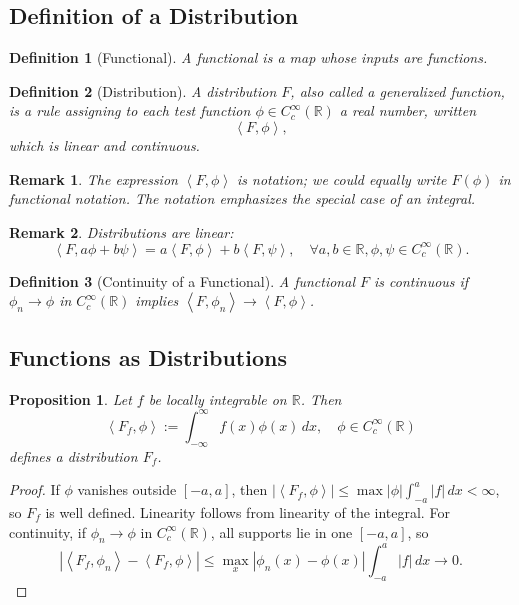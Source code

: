 \documentclass{article}
\newtheorem{definition}{Definition}
\newtheorem{remark}{Remark}
\newtheorem{proposition}{Proposition}
\newcommand{\R}{\mathbb{R}}
\newcommand{\D}{C_c^\infty(\R)}
\newcommand{\ip}[2]{\left\langle #1, #2 \right\rangle}
\newcommand{\intinf}{\int_{-\infty}^{\infty}}
\begin{document}
\subsection{Definition of a Distribution}
\begin{definition}[Functional]
    A functional is a map whose inputs are functions.
\end{definition}
\begin{definition}[Distribution]
    A distribution $F$, also called a generalized function, is a rule assigning to each test function $\phi \in C^{\infty}_{c}(\R)$ a real number, written
    \begin{equation}
        \label{eq:distribution}
        \ip{F}{\phi},
    \end{equation}
    which is linear and continuous.
\end{definition}
\begin{remark}
    The expression $\ip{F}{\phi}$ is notation; we could equally write $F(\phi)$ in functional notation. The notation emphasizes the special case of an integral.
\end{remark}
\begin{remark}
    Distributions are linear:
    \[\ip{F}{a\phi+b\psi} = a\ip{F}{\phi} + b\ip{F}{\psi}, \quad \forall a,b \in\R, \phi,\psi \in C^{\infty}_c(\R).\]
\end{remark}
\begin{definition}[Continuity of a Functional]
    A functional $F$ is continuous if $\phi_n\to\phi$ in $C^{\infty}_c(\R)$ implies $\ip{F}{\phi_n} \to \ip{F}{\phi}$.
\end{definition}

\subsection{Functions as Distributions}
\begin{proposition}
    Let $f$ be locally integrable on $\R$. Then
    \begin{equation}
        \label{eq:function-distribution}
        \ip{F_f}{\phi} := \intinf f(x)\phi(x)\,dx,\quad \phi\in C_c^{\infty}(\R)
    \end{equation}
    defines a distribution $F_f$.
\end{proposition}
\begin{proof}
    If $\phi$ vanishes outside $[-a,a]$, then $\left|\ip{F_f}{\phi}\right| \le \max|\phi|\int_{-a}^{a}|f|\,dx < \infty$, so $F_f$ is well defined. Linearity follows from linearity of the integral. For continuity, if $\phi_n\to\phi$ in $\D$, all supports lie in one $[-a,a]$, so
    \[\left|\ip{F_f}{\phi_n} - \ip{F_f}{\phi}\right| \le \max_{x}|\phi_n(x)-\phi(x)|\int_{-a}^{a}|f|\,dx \to 0.\]
\end{proof}
\end{document}
